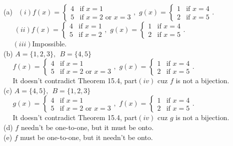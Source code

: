 \documentclass[11pt, a4paper, UTF8]{ctexart}
\begin{document}
\begin{solution}
  (a) $~~(i)f(x) = 
        \begin{cases}
          4& \text{if $x = 1$}\\
          5& \text{if $x = 2$ or $x = 3$}
        \end{cases},$
      $g(x) = 
        \begin{cases}
          1& \text{if $x = 4$}\\
          2& \text{if $x = 5$}
        \end{cases}.$\\
  $~~~~~~~(ii)f(x) = 
        \begin{cases}
          4& \text{if $x = 1$}\\
          5& \text{if $x = 2$}
        \end{cases},$
      $g(x) = 
        \begin{cases}
          1& \text{if $x = 4$}\\
          2& \text{if $x = 5$}
        \end{cases}.$\\
  $~~~~~~(iii)$Impossible.\\
  (b) $A = \{1,2,3\},~~B = \{4,5\}$\\
  $~~~~~~f(x) = 
           \begin{cases}
            4& \text{if $x = 1$}\\
            5& \text{if $x = 2$ or $x = 3$}
          \end{cases},$
        $g(x) = 
          \begin{cases}
            1& \text{if $x = 4$}\\
            2& \text{if $x = 5$}
          \end{cases}.$\\
  $~~~~~~$It doesn't contradict Theorem 15.4, part$(iv)$ cuz $f$ is not a bijection.\\
  (c) $A = \{4,5\},~~B = \{1,2,3\}$\\
  $~~~~~~g(x) = 
           \begin{cases}
            4& \text{if $x = 1$}\\
            5& \text{if $x = 2$ or $x = 3$}
          \end{cases},$
        $f(x) = 
          \begin{cases}
            1& \text{if $x = 4$}\\
            2& \text{if $x = 5$}
          \end{cases}.$\\
  $~~~~~~$It doesn't contradict Theorem 15.4, part$(iv)$ cuz $g$ is not a bijection.\\
  (d) $f$ needn't be one-to-one, but it must be onto.\\
  (e) $f$ must be one-to-one, but it needn't be onto.
\end{solution}
\end{document}
